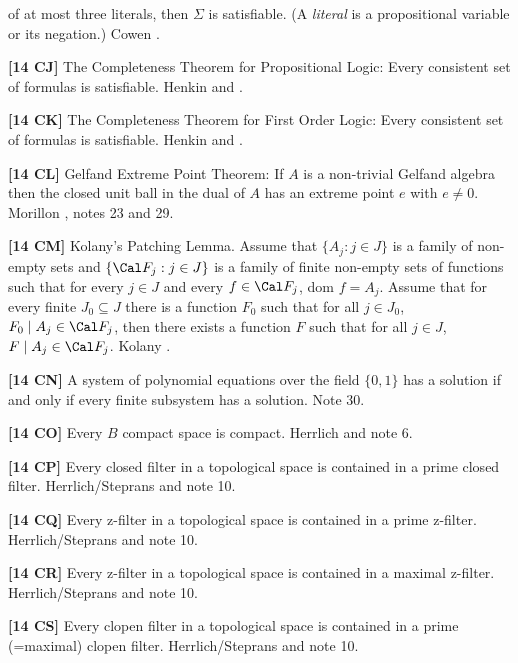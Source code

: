 of at most three literals, then $\Sigma$ is satisfiable.
(A {\it literal} is a propositional variable or its negation.)
\ac{Cowen} \cite{1990}.
\smallskip
\item{}{\bf [14 CJ]} The Completeness Theorem for Propositional Logic:
Every consistent set of formulas is satisfiable.  \ac{Henkin} \cite{1954a}
and \cite{1954b}.
\smallskip
\item{}{\bf [14 CK]} The Completeness Theorem for First Order Logic:
Every consistent set of formulas is satisfiable.  \ac{Henkin} \cite{1954a}
and \cite{1954b}.
\smallskip
\item{}{\bf [14 CL]} Gelfand Extreme Point Theorem:  If $A$ is a
non-trivial Gelfand algebra then the closed unit ball in the dual
of $A$ has an extreme point $e$ with $e\ne 0$. \ac{Morillon} \cite{1986},
notes 23 and 29. 
\smallskip
\item{}{\bf [14 CM]} Kolany's Patching Lemma.  Assume that
$\{A_j : j\in J\}$ is a family of non-empty sets and $\{ \Cal F_j :
j\in J\}$ is a family of finite non-empty sets of functions such that
for every $j\in J$ and every $f\in \Cal F_j$, dom $f = A_j$.  Assume
that for every finite $J_0 \subseteq J$ there is a function $F_0$ such
that for all $j\in J_0$, $F_0\mid A_j \in \Cal F_j$, then there exists
a function $F$ such that for all $j\in J$, $F\mid A_j \in \Cal F_j$.
\ac{Kolany} \cite{1999}. 
\smallskip
\item{}{\bf [14 CN]} A system of polynomial equations over the field
$\{0,1\}$ has a solution if and only if every finite subsystem has
a solution. Note 30.
\smallskip
\item{}{\bf [14 CO]} Every $B$ compact space is compact.  \ac{Herrlich}
\cite{1996a} and note 6.
\smallskip
\item{}{\bf [14 CP]} Every closed filter in a topological space is
contained in a prime closed filter.  \ac{Herrlich/Steprans}
\cite{1997} and note 10.
\smallskip
\item{}{\bf [14 CQ]} Every z-filter in a topological space is contained
in a prime z-filter.  \ac{Herrlich/Steprans} \cite{1997} and note 10.
\smallskip
\item{}{\bf [14 CR]} Every z-filter in a topological space is contained
in a maximal z-filter. \ac{Herrlich/Steprans} \cite{1997} and note 10.
\smallskip
\item{}{\bf [14 CS]} Every clopen filter in a topological space is
contained in a prime (=maximal) clopen filter. \ac{Herrlich/Steprans}
\cite{1997} and note 10.
